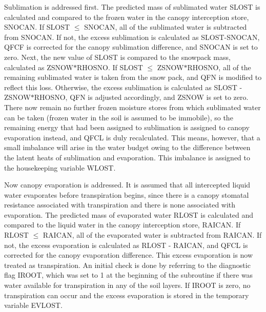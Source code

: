 Sublimation is addressed first. The predicted mass of sublimated water S\+L\+O\+S\+T is calculated and compared to the frozen water in the canopy interception store, S\+N\+O\+C\+A\+N. If S\+L\+O\+S\+T $\leq$ S\+N\+O\+C\+A\+N, all of the sublimated water is subtracted from S\+N\+O\+C\+A\+N. If not, the excess sublimation is calculated as S\+L\+O\+S\+T-\/\+S\+N\+O\+C\+A\+N, Q\+F\+C\+F is corrected for the canopy sublimation difference, and S\+N\+O\+C\+A\+N is set to zero. Next, the new value of S\+L\+O\+S\+T is compared to the snowpack mass, calculated as Z\+S\+N\+O\+W$\ast$\+R\+H\+O\+S\+N\+O. If S\+L\+O\+S\+T $\leq$ Z\+S\+N\+O\+W$\ast$\+R\+H\+O\+S\+N\+O, all of the remaining sublimated water is taken from the snow pack, and Q\+F\+N is modified to reflect this loss. Otherwise, the excess sublimation is calculated as S\+L\+O\+S\+T -\/ Z\+S\+N\+O\+W$\ast$\+R\+H\+O\+S\+N\+O, Q\+F\+N is adjusted accordingly, and Z\+S\+N\+O\+W is set to zero. There now remain no further frozen moisture stores from which sublimated water can be taken (frozen water in the soil is assumed to be immobile), so the remaining energy that had been assigned to sublimation is assigned to canopy evaporation instead, and Q\+F\+C\+L is duly recalculated. This means, however, that a small imbalance will arise in the water budget owing to the difference between the latent heats of sublimation and evaporation. This imbalance is assigned to the housekeeping variable W\+L\+O\+S\+T.

Now canopy evaporation is addressed. It is assumed that all intercepted liquid water evaporates before transpiration begins, since there is a canopy stomatal resistance associated with transpiration and there is none associated with evaporation. The predicted mass of evaporated water R\+L\+O\+S\+T is calculated and compared to the liquid water in the canopy interception store, R\+A\+I\+C\+A\+N. If R\+L\+O\+S\+T $\leq$ R\+A\+I\+C\+A\+N, all of the evaporated water is subtracted from R\+A\+I\+C\+A\+N. If not, the excess evaporation is calculated as R\+L\+O\+S\+T -\/ R\+A\+I\+C\+A\+N, and Q\+F\+C\+L is corrected for the canopy evaporation difference. This excess evaporation is now treated as transpiration. An initial check is done by referring to the diagnostic flag I\+R\+O\+O\+T, which was set to 1 at the beginning of the subroutine if there was water available for transpiration in any of the soil layers. If I\+R\+O\+O\+T is zero, no transpiration can occur and the excess evaporation is stored in the temporary variable E\+V\+L\+O\+S\+T. 
